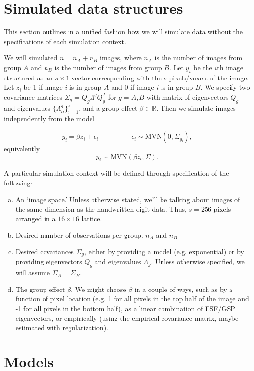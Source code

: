 \documentclass[12pt]{article}
\begin{document}
\section*{Simulated data structures}

This section outlines in a unified fashion how we will simulate data without the specifications of each simulation context.

We will simulated $n=n_A+n_B$ images, where $n_A$ is the number of images from group $A$ and $n_B$ is the number of images from group $B$. Let $y_i$ be the $i$th image structured as an $s\times 1$ vector corresponding with the $s$ pixels/voxels of the image. Let $z_i$ be 1 if image $i$ is in group $A$ and 0 if image $i$ is in group $B$. We specify two covariance matrices $\Sigma_g=Q_g\Lambda^g Q_g^T$ for $g=A,B$ with matrix of eigenvectors $Q_g$ and eigenvalues $\{\Lambda_{ii}^g\}_{i=1}^s$, and a group effect $\beta\in\mathbb R$. Then we simulate images independently from the model

$$y_i =\beta z_i + \epsilon_i\hspace{2cm}\epsilon_i\sim\text{MVN}(0,\Sigma_{g_i}),$$
equivalently
$$y_i\sim\text{MVN}(\beta z_i,\Sigma).$$

A particular simulation context will be defined through specification of the following:
\begin{enumerate}[(a)]
	\item An `image space.' Unless otherwise stated, we'll be talking about images of the same dimension as the handwritten digit data. Thus, $s=256$ pixels arranged in a $16\times16$ lattice.
	\item Desired number of observations per group, $n_A$ and $n_B$
	\item Desired covariances $\Sigma_g$, either by providing a model (e.g. exponential) or by providing eigenvectors $Q_g$ and eigenvalues $\Lambda_g$. Unless otherwise specified, we will assume $\Sigma_A=\Sigma_B$.
	\item The group effect $\beta$. We might choose $\beta$ in a couple of ways, such as by a function of pixel location (e.g. 1 for all pixels in the top half of the image and -1 for all pixels in the bottom half), as a linear combination of ESF/GSP eigenvectors, or empirically (using the empirical covariance matrix, maybe estimated with regularization).
\end{enumerate}


\section*{Models}
\end{document}
